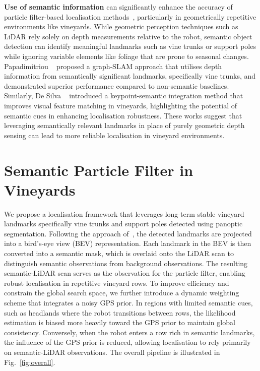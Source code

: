 \documentclass[letterpaper, 10 pt, conference]{ieeeconf}
\begin{document}
\textbf{Use of semantic information} can significantly enhance the accuracy of particle filter-based localisation methods~\cite{huang2024semantics}, particularly in geometrically repetitive environments like vineyards. While geometric perception techniques such as LiDAR rely solely on depth measurements relative to the robot, semantic object detection can identify meaningful landmarks such as vine trunks or support poles while ignoring variable elements like foliage that are prone to seasonal changes. Papadimitriou \etal~\cite{papadimitriou2022loop} proposed a graph-SLAM approach that utilises depth information from semantically significant landmarks, specifically vine trunks, and demonstrated superior performance compared to non-semantic baselines. Similarly, De Silva \etal~\cite{de2025keypoint} introduced a keypoint-semantic integration method that improves visual feature matching in vineyards, highlighting the potential of semantic cues in enhancing localisation robustness. These works suggest that leveraging semantically relevant landmarks in place of purely geometric depth sensing can lead to more reliable localisation in vineyard environments.

\section{Semantic Particle Filter in Vineyards}
\label{sec:main}
We propose a localisation framework that leverages long-term stable vineyard landmarks specifically vine trunks and support poles detected using panoptic segmentation. Following the approach of~\cite{7759339}, the detected landmarks are projected into a bird’s-eye view (BEV) representation. Each landmark in the BEV is then converted into a semantic mask, which is overlaid onto the LiDAR scan to distinguish semantic observations from background observations. The resulting semantic-LiDAR scan serves as the observation for the particle filter, enabling robust localisation in repetitive vineyard rows. To improve efficiency and constrain the global search space, we further introduce a dynamic weighting scheme that integrates a noisy GPS prior. In regions with limited semantic cues, such as headlands where the robot transitions between rows, the likelihood estimation is biased more heavily toward the GPS prior to maintain global consistency. Conversely, when the robot enters a row rich in semantic landmarks, the influence of the GPS prior is reduced, allowing localisation to rely primarily on semantic-LiDAR observations. The overall pipeline is illustrated in Fig.~\ref{fig:overall}.
\end{document}
